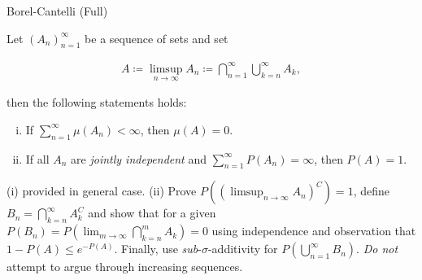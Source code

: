 \begin{lemma}{6.9}{Borel-Cantelli (Full)}

    Let $(A_n)_{n=1}^{\infty}$ be a sequence of sets and set

        \begin{align*}
            A \coloneqq \limsup_{n \to \infty} A_n \coloneqq \bigcap_{n=1}^{\infty}\bigcup_{k=n}^{\infty} A_k,
        \end{align*}

    then the following statements holds:

        \begin{enumerate}[(i)]
            \item If $\sum_{n=1}^{\infty} \mu(A_n) < \infty$, then $\mu(A) = 0$.
            \item If all $A_n$ are \emph{jointly independent} and $\sum_{n=1}^{\infty} P(A_n) = \infty$, then $P(A) = 1$.
        \end{enumerate}

    \Hint (i) provided in general case. (ii) Prove $P((\limsup_{n \to \infty} A_n)^C) = 1$, define $B_n = \bigcap_{k=n}^{\infty} A_k^C$ and show that for a given $P(B_n) = P(\lim_{m \to \infty} \bigcap_{k=n}^{m} A_k) = 0$ using independence and observation that $1 - P(A) \leq e^{-P(A)}$. Finally, use \emph{sub}-$\sigma$-additivity for $P(\bigcup_{n=1}^{\infty} B_n)$. \emph{Do not} attempt to argue through increasing sequences.
    
\end{lemma}
